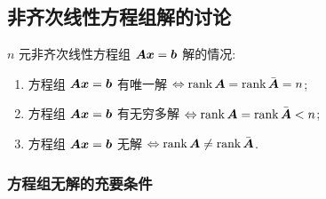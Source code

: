 \subsection{非齐次线性方程组解的讨论}

\begin{theorem}[非齐次线性方程组有解的条件]
    $n$ 元非齐次线性方程组 $\vb*{Ax}=\vb*{b}$ 解的情况:
    \begin{enumerate}[label=(\arabic{*})]
        \item 方程组 $\vb*{Ax}=\vb*{b}$ 有唯一解 $\Leftrightarrow \rank\vb*{A}=\rank\bar{\vb*{A}}=n$;
        \item 方程组 $\vb*{Ax}=\vb*{b}$ 有无穷多解 $\Leftrightarrow \rank\vb*{A}=\rank\bar{\vb*{A}}<n$;
        \item 方程组 $\vb*{Ax}=\vb*{b}$ 无解 $\Leftrightarrow \rank\vb*{A}\neq\rank\bar{\vb*{A}}$.
    \end{enumerate}
\end{theorem}

\subsubsection{方程组无解的充要条件}

